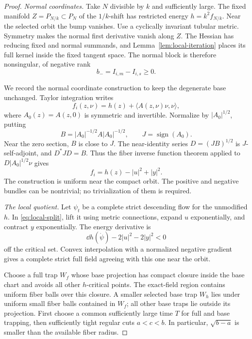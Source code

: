 \begin{proof}
\emph{Normal coordinates.}
Take \(N\) divisible by \(k\) and sufficiently large.
The fixed manifold \(Z=P_{N/k}\subset P_N\) of the
\(1/k\)-shift has restricted energy
\(h=k^2f_{N/k}\).  Near the selected orbit the bump vanishes.
Use a cyclically invariant tubular metric.  Symmetry makes
the normal first derivative vanish along \(Z\).  The
Hessian has reducing fixed and normal summands, and
Lemma~\ref{lem:local-iteration} places its full kernel
inside the fixed tangent space.  The normal block is
therefore nonsingular, of negative rank
\[
 b_-=I_{i,m}-I_{i,s}\ge0.
\]

We record the normal coordinate construction to keep the
degenerate base unchanged.  Taylor integration writes
\[
 f_i(z,\nu)=h(z)+\langle A(z,\nu)\nu,\nu\rangle,
\]
where \(A_0(z)=A(z,0)\) is symmetric and invertible.
Normalize by \(|A_0|^{1/2}\), putting
\[
 B=|A_0|^{-1/2}A|A_0|^{-1/2},\qquad
 J=\operatorname{sign}(A_0).
\]
Near the zero section, \(B\) is close to \(J\).  The
near-identity series \(D=(JB)^{1/2}\) is \(J\)-self-adjoint,
and \(D^*JD=B\).  Thus the fiber inverse function theorem
applied to \(D|A_0|^{1/2}\nu\) gives
\begin{equation}\label{eq:local-split}
 f_i=h(z)-|u|^2+|y|^2.
\end{equation}
The construction is uniform near the compact orbit.
The positive and negative bundles can be nontrivial; no
trivialization of them is required.

\emph{The local quotient.}
Let \(\psi_t\) be a complete strict descending flow for the
unmodified \(h\).  In \eqref{eq:local-split}, lift it using
metric connections, expand \(u\) exponentially, and contract
\(y\) exponentially.  The energy derivative is
\[
 \dd h(\dot\psi)-2|u|^2-2|y|^2<0
\]
off the critical set.  Convex interpolation with a
normalized negative gradient gives a complete strict
full field agreeing with this one near the orbit.

Choose a full trap \(W_f\) whose base projection has compact
closure inside the base chart and avoids all other
\(h\)-critical points.  The exact-field region contains
uniform fiber balls over this closure.  A smaller selected
base trap \(W_h\) lies under uniform small fiber balls
contained in \(W_f\); all other base traps lie outside
its projection.  First choose a common sufficiently large
time \(T\) for full and base trapping, then sufficiently
tight regular cuts \(a<c<b\).  In particular,
\(\sqrt{b-a}\) is smaller than the available fiber radius.


\end{proof}
